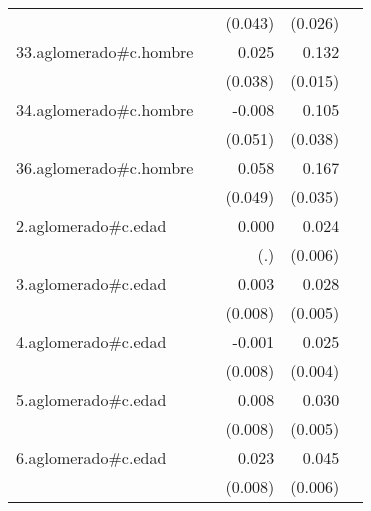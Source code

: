 {\begin{longtable}{l*{4}{D{.}{.}{-1}}}
            &                     &     (0.043)         &     (0.026)         &                     \\
\addlinespace
33.aglomerado#c.hombre&                     &       0.025         &       0.132\sym{***}&                     \\
            &                     &     (0.038)         &     (0.015)         &                     \\
\addlinespace
34.aglomerado#c.hombre&                     &      -0.008         &       0.105\sym{**} &                     \\
            &                     &     (0.051)         &     (0.038)         &                     \\
\addlinespace
36.aglomerado#c.hombre&                     &       0.058         &       0.167\sym{***}&                     \\
            &                     &     (0.049)         &     (0.035)         &                     \\
\addlinespace
2.aglomerado#c.edad&                     &       0.000         &       0.024\sym{***}&                     \\
            &                     &         (.)         &     (0.006)         &                     \\
\addlinespace
3.aglomerado#c.edad&                     &       0.003         &       0.028\sym{***}&                     \\
            &                     &     (0.008)         &     (0.005)         &                     \\
\addlinespace
4.aglomerado#c.edad&                     &      -0.001         &       0.025\sym{***}&                     \\
            &                     &     (0.008)         &     (0.004)         &                     \\
\addlinespace
5.aglomerado#c.edad&                     &       0.008         &       0.030\sym{***}&                     \\
            &                     &     (0.008)         &     (0.005)         &                     \\
\addlinespace
6.aglomerado#c.edad&                     &       0.023\sym{**} &       0.045\sym{***}&                     \\
            &                     &     (0.008)         &     (0.006)         &                     \\

\end{longtable}}
